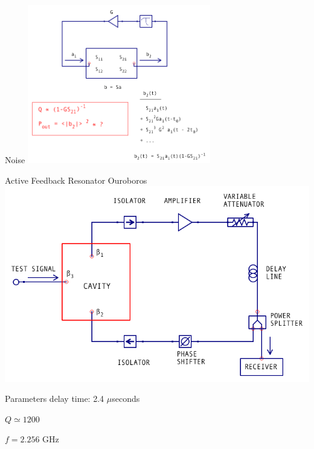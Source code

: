 \documentclass{beamer}
\begin{document}
\begin{frame}{Noise}
\centering
\includegraphics[width=0.6\textwidth]{export_sparams_12}
\end{frame}

\begin{frame}{Active Feedback Resonator}
{\tiny Ouroboros}
\includegraphics[width=\textwidth]{export_ouroboros}
\end{frame}

\begin{frame}{Parameters}
delay time: 2.4 $\mu$seconds

$Q \simeq 1200$

$f = 2.256$ GHz
\end{frame}
\end{document}
